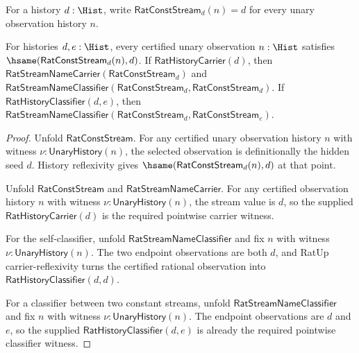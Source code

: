\begin{definition}
\label{def:rat-stream-name-constant}
For a history $d:\Hist$, write $\mathsf{RatConstStream}_d(n)=d$ for every unary
observation history $n$.
\end{definition}

\begin{theorem}
\label{thm:rat-stream-name-constant-witness}
For histories $d,e:\Hist$, every certified unary observation $n:\Hist$
satisfies $\hsame(\mathsf{RatConstStream}_d(n),d)$. If
$\mathsf{RatHistoryCarrier}(d)$, then
$\mathsf{RatStreamNameCarrier}(\mathsf{RatConstStream}_d)$ and
$\mathsf{RatStreamNameClassifier}(\mathsf{RatConstStream}_d,
\mathsf{RatConstStream}_d)$. If $\mathsf{RatHistoryClassifier}(d,e)$, then
$\mathsf{RatStreamNameClassifier}(\mathsf{RatConstStream}_d,
\mathsf{RatConstStream}_e)$.
\end{theorem}
\begin{proof}
Unfold $\mathsf{RatConstStream}$. For any certified unary observation history
$n$ with witness $\nu:\mathsf{UnaryHistory}(n)$, the selected observation is
definitionally the hidden seed $d$. History reflexivity gives
$\hsame(\mathsf{RatConstStream}_d(n),d)$ at that point.

Unfold $\mathsf{RatConstStream}$ and
$\mathsf{RatStreamNameCarrier}$. For any certified observation history $n$ with
witness $\nu:\mathsf{UnaryHistory}(n)$, the stream value is $d$, so the supplied
$\mathsf{RatHistoryCarrier}(d)$ is the required pointwise carrier witness.

For the self-classifier, unfold $\mathsf{RatStreamNameClassifier}$ and fix
$n$ with witness $\nu:\mathsf{UnaryHistory}(n)$. The two endpoint observations
are both $d$, and RatUp carrier-reflexivity turns the certified rational
observation into $\mathsf{RatHistoryClassifier}(d,d)$.

For a classifier between two constant streams, unfold
$\mathsf{RatStreamNameClassifier}$ and fix $n$ with witness
$\nu:\mathsf{UnaryHistory}(n)$. The endpoint observations are $d$ and $e$, so
the supplied $\mathsf{RatHistoryClassifier}(d,e)$ is already the required
pointwise classifier witness.
\end{proof}

